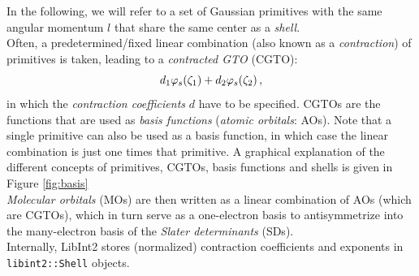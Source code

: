 \documentclass[12pt]{article}
\begin{document}
    In the following, we will refer to a set of Gaussian primitives with the same angular momentum $l$ that share the same center as a \textit{shell}. \\

    Often, a predetermined/fixed linear combination (also known as a \textit{contraction}) of primitives is taken, leading to a \textit{contracted GTO} (CGTO):
    \begin{equation}
        d_1 \varphi_s(\zeta_1) + d_2 \varphi_s(\zeta_2) \thinspace ,
    \end{equation}
    in which the \textit{contraction coefficients} $d$ have to be specified. CGTOs are the functions that are used as \textit{basis functions} (\textit{atomic orbitals}: AOs). Note that a single primitive can also be used as a basis function, in which case the linear combination is just one times that primitive. A graphical explanation of the different concepts of primitives, CGTOs, basis functions and shells is given in Figure \ref{fig:basis}\\

    \textit{Molecular orbitals} (MOs) are then written as a linear combination of AOs (which are CGTOs), which in turn serve as a one-electron basis to antisymmetrize into the many-electron basis of the \textit{Slater determinants} (SDs). \cite{jensen2007} \\

    Internally, LibInt2 stores (normalized) contraction coefficients and exponents in \lstinline{libint2::Shell} objects.
\end{document}
